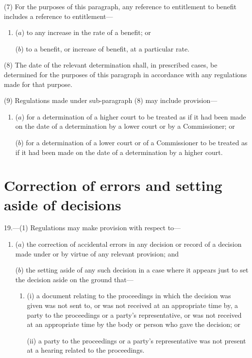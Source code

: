 \documentclass[12pt,a4paper]{article}
\begin{document}
(7) For the purposes of this paragraph, any reference to entitlement to benefit includes a reference to entitlement—
\begin{enumerate}\item[]
($a$) to any increase in the rate of a benefit; or

($b$) to a benefit, or increase of benefit, at a particular rate.
\end{enumerate}

(8) The date of the relevant determination shall, in prescribed cases, be determined for the purposes of this paragraph in accordance with any regulations made for that purpose.

(9) Regulations made under sub-paragraph (8)  may include provision—
\begin{enumerate}\item[]
($a$) for a determination of a higher court to be treated as if it had been made on the date of a determination by a lower court or by a Commissioner; or

($b$) for a determination of a lower court or of a Commissioner to be treated as if it had been made on the date of a determination by a higher court.
\end{enumerate}


\section*{Correction of errors and setting aside of decisions}

19.---(1) Regulations may make provision with respect to—
\begin{enumerate}\item[]
($a$) the correction of accidental errors in any decision or record of a decision made under or by virtue of any relevant provision; and

($b$) the setting aside of any such decision in a case where it appears just to set the decision aside on the ground that—
\begin{enumerate}\item[]
(i) a document relating to the proceedings in which the decision was given was not sent to, or was not received at an appropriate time by, a party to the proceedings or a party’s representative, or was not received at an appropriate time by the body or person who gave the decision; or

(ii) a party to the proceedings or a party’s representative was not present at a hearing related to the proceedings.
\end{enumerate}
\end{enumerate}
\end{document}
